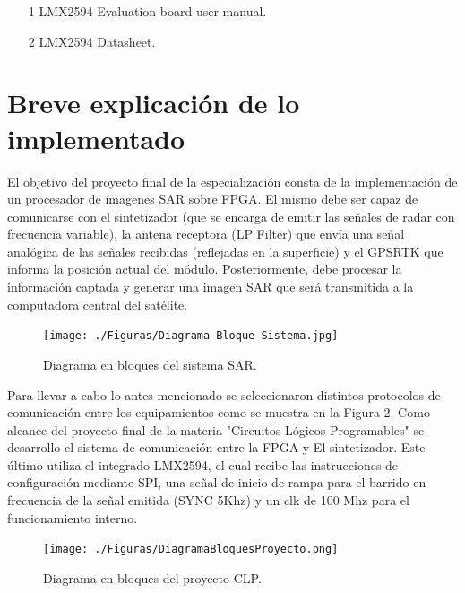 \documentclass[
11pt, %
]{charter}
\begin{document}
\begin{enumerate}
\item [1]LMX2594 Evaluation board user manual.
\item [2]LMX2594 Datasheet.
\end{enumerate}



\section{Breve explicación de lo implementado}
\label{sec:orgc1c4017}

El objetivo del proyecto final de la especialización consta de la implementación de un procesador de imagenes SAR sobre FPGA.
El mismo debe ser capaz de comunicarse con el sintetizador (que se encarga de emitir las señales de radar con frecuencia variable), la antena receptora (LP Filter) que envía una señal analógica de las señales recibidas (reflejadas en la superficie) y el GPSRTK que informa la posición actual del módulo.
Posteriormente, debe procesar la información captada y generar una imagen SAR que será transmitida a la computadora central del satélite.


\begin{figure}[htpb]
\centering 
\texttt{[image: ./Figuras/Diagrama Bloque Sistema.jpg]}
\caption{Diagrama en bloques del sistema SAR.}
\label{fig:diagBloques}
\end{figure}

\vspace{25px}

Para llevar a cabo lo antes mencionado se seleccionaron distintos protocolos de comunicación entre los equipamientos como se muestra en la Figura 2.
Como alcance del proyecto final de la materia "Circuitos Lógicos Programables" se desarrollo el sistema de comunicación entre la FPGA y El sintetizador. Este último utiliza el integrado LMX2594, el cual recibe las instrucciones de configuración mediante SPI, una señal de inicio de rampa para el barrido en frecuencia de la señal emitida (SYNC 5Khz) y un clk de 100 Mhz para el funcionamiento interno.

\newpage 

\begin{figure}[htpb]
\centering 
\texttt{[image: ./Figuras/DiagramaBloquesProyecto.png]}
\caption{Diagrama en bloques del proyecto CLP.}
\label{fig:diagBloques}
\end{figure}

\vspace{25px}
\end{document}
